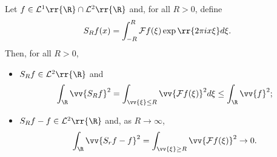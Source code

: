 \documentclass{article}
\begin{document}
\begin{theorem}
  Let $f\in\mathcal L^1\rr{\R}\cap\mathcal L^{2}\rr{\R}$ and, for all
  $R>0$, define
  \begin{align*}
    S_R f(x) = \int_{-R}^R \mathcal F f(\xi)\exp\rr{2\pi i x\xi}d\xi.
  \end{align*}
  Then, for all $R>0$,
  \begin{itemize}
    \item $S_R f\in\mathcal L^2\rr{\R}$ and
      \begin{align*}
        \int_\R \vv{S_R f}^2 = \int_{\vv{\xi}\leq R} \vv{\mathcal F f(\xi)}^2
        d\xi \leq \int_\R \vv{f}^2;
      \end{align*}
    \item $S_R f-f\in\mathcal L^{2}\rr{\R}$ and, as $R\to\infty$,
      \begin{align*}
        \int_\R \vv{S_r f - f}^2 = \int_{\vv{\xi}\geq R} \vv{\mathcal F f(\xi)}^2 \to 0.
      \end{align*}
  \end{itemize}
\end{theorem}
\end{document}
